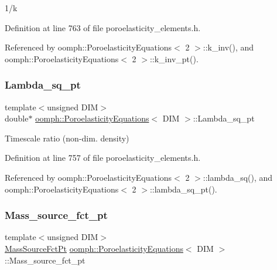 1/k 



Definition at line 763 of file poroelasticity\+\_\+elements.\+h.



Referenced by oomph\+::\+Poroelasticity\+Equations$<$ 2 $>$\+::k\+\_\+inv(), and oomph\+::\+Poroelasticity\+Equations$<$ 2 $>$\+::k\+\_\+inv\+\_\+pt().

\mbox{\label{classoomph_1_1PoroelasticityEquations_af0a463020f0fbcb27345ba726522523f}} 
\subsubsection{\texorpdfstring{Lambda\+\_\+sq\+\_\+pt}{Lambda\_sq\_pt}}
{\footnotesize\ttfamily template$<$unsigned D\+IM$>$ \\
double$\ast$ \hyperlink{classoomph_1_1PoroelasticityEquations}{oomph\+::\+Poroelasticity\+Equations}$<$ D\+IM $>$\+::Lambda\+\_\+sq\+\_\+pt\hspace{0.3cm}{\ttfamily [private]}}



Timescale ratio (non-\/dim. density) 



Definition at line 757 of file poroelasticity\+\_\+elements.\+h.



Referenced by oomph\+::\+Poroelasticity\+Equations$<$ 2 $>$\+::lambda\+\_\+sq(), and oomph\+::\+Poroelasticity\+Equations$<$ 2 $>$\+::lambda\+\_\+sq\+\_\+pt().

\mbox{\label{classoomph_1_1PoroelasticityEquations_a15153a0c51a6537c157793c6ab2308b9}} 
\subsubsection{\texorpdfstring{Mass\+\_\+source\+\_\+fct\+\_\+pt}{Mass\_source\_fct\_pt}}
{\footnotesize\ttfamily template$<$unsigned D\+IM$>$ \\
\hyperlink{classoomph_1_1PoroelasticityEquations_a8edb2644708db2f2ae03254ea3143262}{Mass\+Source\+Fct\+Pt} \hyperlink{classoomph_1_1PoroelasticityEquations}{oomph\+::\+Poroelasticity\+Equations}$<$ D\+IM $>$\+::Mass\+\_\+source\+\_\+fct\+\_\+pt\hspace{0.3cm}{\ttfamily [private]}}



